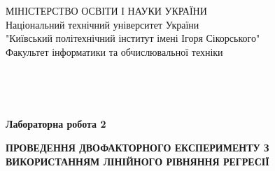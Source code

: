 \begin{titlepage}
     \begin{center}
      {\selectfont МІНІСТЕРСТВО ОСВІТИ І НАУКИ УКРАЇНИ} \\
      Національний технічний університет України
      \\ "Київський політехнічний інститут імені Ігоря Сікорського"
      \\ Факультет інформатики та обчислювальної техніки
     \end{center}  

    $\;$
    
    $\;$
    
    $\;$
    
    $\;$
    
    $\;$
    
    \vspace{0.5cm}
    \begin{center}
     {\large\textbf{Лабораторна робота 2}\par}
     \vspace{0.5cm}
     \textbf{ПРОВЕДЕННЯ ДВОФАКТОРНОГО ЕКСПЕРИМЕНТУ З
     ВИКОРИСТАННЯМ ЛІНІЙНОГО РІВНЯННЯ РЕГРЕСІЇ}
    \end{center}
    \vspace{2.5cm}


\end{titlepage}

